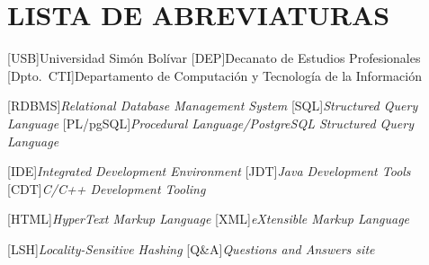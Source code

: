 \chapter*{LISTA DE ABREVIATURAS}
\begin{acronym}
[USB]{Universidad Sim\'on Bol\'ivar}
[DEP]{Decanato de Estudios Profesionales}
[Dpto.~CTI]{Departamento de Computación y Tecnología de la Información}

[RDBMS]{\textit{Relational Database Management System}}
[SQL]{\textit{Structured Query Language}}
[PL/pgSQL]{\textit{Procedural Language/PostgreSQL Structured Query Language}}

[IDE]{\textit{Integrated Development Environment}}
[JDT]{\textit{Java Development Tools}}
[CDT]{\textit{C/C++ Development Tooling}}

[HTML]{\textit{HyperText Markup Language}}
[XML]{\textit{eXtensible Markup Language}}

[LSH]{\textit{Locality-Sensitive Hashing}}
[Q\&A]{\textit{Questions and Answers site}}

\end{acronym}
\clearpage